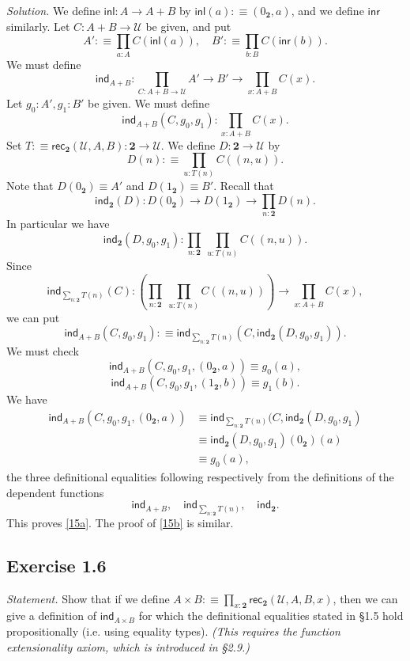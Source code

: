 \documentclass[12pt]{article}
\newcommand{\ind}{\mathsf{ind}}
\newcommand{\inl}{\mathsf{inl}}
\newcommand{\inr}{\mathsf{inr}}
\newcommand{\nn}{\noindent}
\newcommand{\rec}{\mathsf{rec}}
\newcommand{\two}{\mathbf2}
\newcommand{\U}{\mathcal U}
\begin{document}
\nn\emph{Solution.} We define $\inl:A\to A+B$ by $\inl(a):\equiv(0_\two,a)$, and we define $\inr$ similarly. Let $C:A+B\to\U$ be given, and put 
$$
A':\equiv\prod_{a:A}C(\inl(a)),\quad B':\equiv\prod_{b:B}C(\inr(b)).
$$
We must define 
$$
\ind_{A+B}:\prod_{C:A+B\to\U}A'\to B'\to\prod_{x:A+B}C(x).
$$ 
Let $g_0:A',g_1:B'$ be given. We must define 
$$
\ind_{A+B}(C,g_0,g_1):\prod_{x:A+B}C(x).
$$ 
Set $T:\equiv\rec_\two(\U,A,B):\two\to\U$. We define $D:\two\to\U$ by 
$$
D(n):\equiv\prod_{u:T(n)}C((n,u)).
$$ 
Note that $D(0_\two)\equiv A'$ and $D(1_\two)\equiv B'$. Recall that 
$$
\ind_\two(D):D(0_\two)\to D(1_\two)\to\prod_{n:\two}D(n).
$$ 
In particular we have 
$$
\ind_\two(D,g_0,g_1):\prod_{n:\two}\ \prod_{u:T(n)}C((n,u)).
$$ 
Since 
$$
\ind_{\sum_{n:\two}T(n)}(C):\left(\prod_{n:\two}\ \prod_{u:T(n)}C((n,u))\right)\to\prod_{x:A+B}C(x),
$$ 
we can put 
$$
\ind_{A+B}(C,g_0,g_1):\equiv\ind_{\sum_{n:\two}T(n)}(C,\ind_\two(D,g_0,g_1)).
$$ 
We must check 
\begin{equation}\label{15a}
\ind_{A+B}(C,g_0,g_1,(0_\two,a))\equiv g_0(a),
\end{equation}
\begin{equation}\label{15b}
\ind_{A+B}(C,g_0,g_1,(1_\two,b))\equiv g_1(b).
\end{equation} 
We have 
\begin{align*}
\ind_{A+B}(C,g_0,g_1,(0_\two,a))&\equiv\ind_{\sum_{n:\two}T(n)}(C,\ind_\two(D,g_0,g_1)\\ 
&\equiv\ind_\two(D,g_0,g_1)(0_\two)(a)\\ 
&\equiv g_0(a),
\end{align*}
the three definitional equalities following respectively from the definitions of the dependent functions
$$
\ind_{A+B},\quad\ind_{\sum_{n:\two}T(n)},\quad\ind_\two.
$$ 
This proves \eqref{15a}. The proof of \eqref{15b} is similar.


\subsection{Exercise 1.6}

\emph{Statement.} Show that if we define $A\times B:\equiv\prod_{x:\two}\rec_\two(\U,A,B,x)$, then we can give a definition of  $\ind_{A\times B}$ for which the definitional equalities stated in \S1.5 hold propositionally (i.e. using equality types). \emph{(This requires the function extensionality axiom, which is introduced in \S2.9.)}
\end{document}

